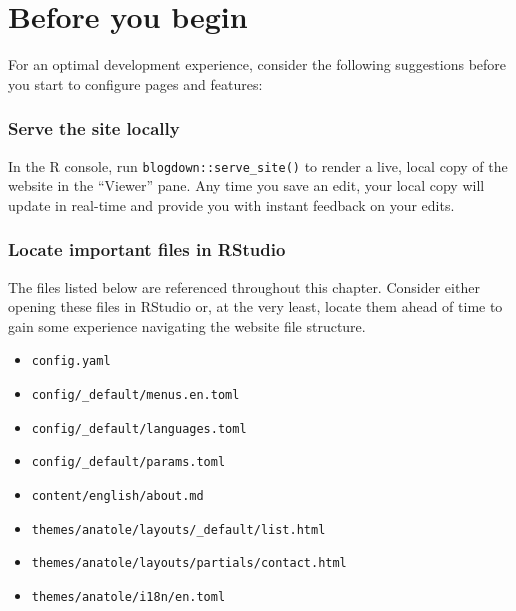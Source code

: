 \documentclass[
]{book}
\providecommand{\tightlist}{%
  \setlength{\itemsep}{0pt}\setlength{\parskip}{0pt}}
\begin{document}
\hypertarget{before-you-begin-1}{%
\section{Before you begin}\label{before-you-begin-1}}

For an optimal development experience, consider the following suggestions before you start to configure pages and features:

\hypertarget{serve-the-site-locally-1}{%
\subsubsection*{Serve the site locally}\label{serve-the-site-locally-1}}

In the R console, run \texttt{blogdown::serve\_site()} to render a live, local copy of the website in the ``Viewer'' pane. Any time you save an edit, your local copy will update in real-time and provide you with instant feedback on your edits.

\hypertarget{locate-important-files-in-rstudio}{%
\subsubsection*{Locate important files in RStudio}\label{locate-important-files-in-rstudio}}

The files listed below are referenced throughout this chapter. Consider either opening these files in RStudio or, at the very least, locate them ahead of time to gain some experience navigating the website file structure.

\begin{itemize}
\tightlist
\item
  \texttt{config.yaml}
\item
  \texttt{config/\_default/menus.en.toml}
\item
  \texttt{config/\_default/languages.toml}
\item
  \texttt{config/\_default/params.toml}
\item
  \texttt{content/english/about.md}
\item
  \texttt{themes/anatole/layouts/\_default/list.html}
\item
  \texttt{themes/anatole/layouts/partials/contact.html}
\item
  \texttt{themes/anatole/i18n/en.toml}
\end{itemize}
\end{document}
